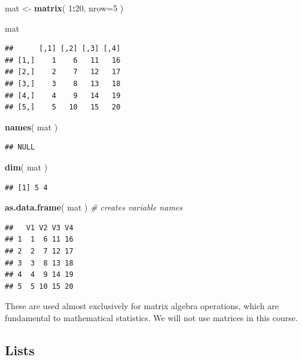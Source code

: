 \documentclass[]{book}
\newenvironment{Shaded}{\begin{snugshade}}{\end{snugshade}}
\newcommand{\CommentTok}[1]{\textcolor[rgb]{0.56,0.35,0.01}{\textit{#1}}}
\newcommand{\DataTypeTok}[1]{\textcolor[rgb]{0.13,0.29,0.53}{#1}}
\newcommand{\DecValTok}[1]{\textcolor[rgb]{0.00,0.00,0.81}{#1}}
\newcommand{\KeywordTok}[1]{\textcolor[rgb]{0.13,0.29,0.53}{\textbf{#1}}}
\newcommand{\NormalTok}[1]{#1}
\newcommand{\OperatorTok}[1]{\textcolor[rgb]{0.81,0.36,0.00}{\textbf{#1}}}
\newcommand{\StringTok}[1]{\textcolor[rgb]{0.31,0.60,0.02}{#1}}
\theoremstyle{definition}
\theoremstyle{definition}
\theoremstyle{definition}
\theoremstyle{remark}
\begin{document}
\begin{Shaded}
\begin{Highlighting}[]
\NormalTok{mat <-}\StringTok{ }\KeywordTok{matrix}\NormalTok{( }\DecValTok{1}\OperatorTok{:}\DecValTok{20}\NormalTok{, }\DataTypeTok{nrow=}\DecValTok{5}\NormalTok{ )}

\NormalTok{mat}
\end{Highlighting}
\end{Shaded}

\begin{verbatim}
##      [,1] [,2] [,3] [,4]
## [1,]    1    6   11   16
## [2,]    2    7   12   17
## [3,]    3    8   13   18
## [4,]    4    9   14   19
## [5,]    5   10   15   20
\end{verbatim}

\begin{Shaded}
\begin{Highlighting}[]
\KeywordTok{names}\NormalTok{( mat )}
\end{Highlighting}
\end{Shaded}

\begin{verbatim}
## NULL
\end{verbatim}

\begin{Shaded}
\begin{Highlighting}[]
\KeywordTok{dim}\NormalTok{( mat )}
\end{Highlighting}
\end{Shaded}

\begin{verbatim}
## [1] 5 4
\end{verbatim}

\begin{Shaded}
\begin{Highlighting}[]
\KeywordTok{as.data.frame}\NormalTok{( mat )  }\CommentTok{# creates variable names}
\end{Highlighting}
\end{Shaded}

\begin{verbatim}
##   V1 V2 V3 V4
## 1  1  6 11 16
## 2  2  7 12 17
## 3  3  8 13 18
## 4  4  9 14 19
## 5  5 10 15 20
\end{verbatim}

These are used almost exclusively for matrix algebra operations, which
are fundamental to mathematical statistics. We will not use matrices in
this course.

\hypertarget{lists}{%
\subsection{Lists}\label{lists}}
\end{document}
